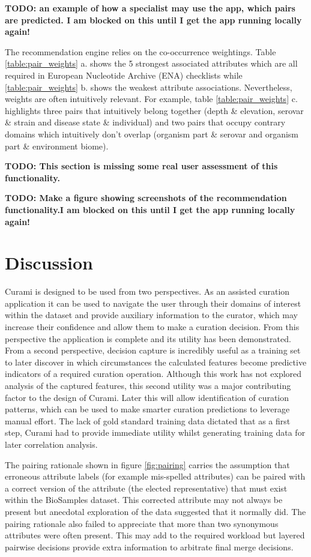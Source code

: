 \documentclass{bmcart}
\begin{document}
\textbf{TODO: an example of how a specialist may use the app, which pairs are predicted. I am blocked on this until I get the app running locally again!}

The recommendation engine relies on the co-occurrence weightings. Table \ref{table:pair_weights} a. shows the 5 strongest associated attributes which are all required in European Nucleotide Archive (ENA) checklists while \ref{table:pair_weights} b. shows the weakest attribute associations. Nevertheless, weights are often intuitively relevant. For example, table \ref{table:pair_weights} c. highlights three pairs that intuitively belong together (depth \& elevation, serovar \& strain and disease state \& individual) and two pairs that occupy contrary domains which intuitively don't overlap (organism part \& serovar and organism part \& environment biome).

\textbf{TODO: This section is missing some real user assessment of this functionality.}

\textbf{TODO: Make a figure showing screenshots of the recommendation functionality.I am blocked on this until I get the app running locally again!}

\section*{Discussion}



Curami is designed to be used from two perspectives. As an assisted curation application it can be used to navigate the user through their domains of interest within the dataset and provide auxiliary information to the curator, which may increase their confidence and allow them to make a curation decision. From this perspective the application is complete and its utility has been demonstrated. From a second perspective, decision capture is incredibly useful as a training set to later discover in which circumstances the calculated features become predictive indicators of a required curation operation. Although this work has not explored analysis of the captured features, this second utility was a major contributing factor to the design of Curami. Later this will allow identification of curation patterns, which can be used to make smarter curation predictions to leverage manual effort. The lack of gold standard training data dictated that as a first step, Curami had to provide immediate utility whilst generating training data for later correlation analysis.

The pairing rationale shown in figure \ref{fig:pairing} carries the assumption that erroneous attribute labels (for example mis-spelled attributes) can be paired with a correct version of the attribute (the elected representative) that must exist within the BioSamples dataset. This corrected attribute may not always be present but anecdotal exploration of the data suggested that it normally did. The pairing rationale also failed to appreciate that more than two synonymous attributes were often present. This may add to the required workload but layered pairwise decisions provide extra information to arbitrate final merge decisions.
\end{document}

